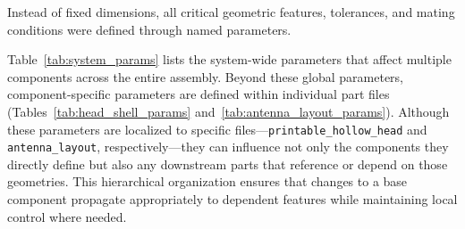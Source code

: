 
Instead of fixed dimensions, all critical geometric features, tolerances, and mating conditions were defined through named parameters. 



Table~\ref{tab:system_params} lists the system-wide parameters that affect multiple components across the entire assembly.
Beyond these global parameters, component-specific parameters are defined within individual part files (Tables~\ref{tab:head_shell_params} 
and~\ref{tab:antenna_layout_params}). Although these parameters are localized to specific files—\texttt{printable\_hollow\_head} and
 \texttt{antenna\_layout}, respectively—they can influence not only the components they directly define but also any downstream parts
  that reference or depend on those geometries. This hierarchical organization ensures that changes to a base component propagate
   appropriately to dependent features while maintaining local control where needed.


